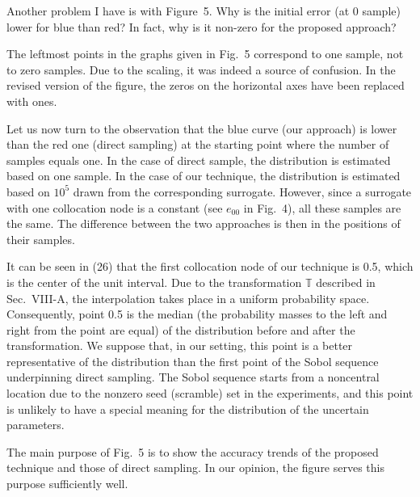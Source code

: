 \begin{reviewer}
Another problem I have is with Figure~5. Why is the initial error (at 0 sample)
lower for blue than red? In fact, why is it non-zero for the proposed approach?
\end{reviewer}

\begin{authors}
The leftmost points in the graphs given in Fig.~5 correspond to one sample, not
to zero samples. Due to the scaling, it was indeed a source of confusion. In the
revised version of the figure, the zeros on the horizontal axes have been
replaced with ones.

Let us now turn to the observation that the blue curve (our approach) is lower
than the red one (direct sampling) at the starting point where the number of
samples equals one. In the case of direct sample, the distribution is estimated
based on one sample. In the case of our technique, the distribution is estimated
based on $10^5$ drawn from the corresponding surrogate. However, since a
surrogate with one collocation node is a constant (see $e_{00}$ in Fig.~4), all
these samples are the same. The difference between the two approaches is then in
the positions of their samples.

It can be seen in (26) that the first collocation node of our technique is 0.5,
which is the center of the unit interval. Due to the transformation $\mathbb{T}$
described in Sec.~VIII-A, the interpolation takes place in a uniform probability
space. Consequently, point 0.5 is the median (the probability masses to the left
and right from the point are equal) of the distribution before and after the
transformation. We suppose that, in our setting, this point is a better
representative of the distribution than the first point of the Sobol sequence
underpinning direct sampling. The Sobol sequence starts from a noncentral
location due to the nonzero seed (scramble) set in the experiments, and this
point is unlikely to have a special meaning for the distribution of the
uncertain parameters.

The main purpose of Fig.~5 is to show the accuracy trends of the proposed
technique and those of direct sampling. In our opinion, the figure serves this
purpose sufficiently well.

\begin{actions}
\end{actions}
\end{authors}
